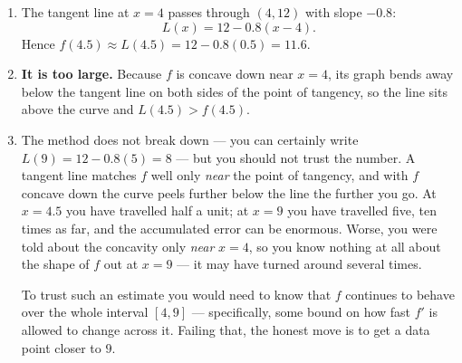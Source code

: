 \documentclass[11pt]{article}
\begin{document}
\begin{enumerate}
\item The tangent line at $x=4$ passes through $(4,12)$ with slope $-0.8$:
\[
L(x) = 12 - 0.8(x-4).
\]
Hence $f(4.5) \approx L(4.5) = 12 - 0.8(0.5) = \boxed{11.6}$.

\item \textbf{It is too large.} Because $f$ is concave down near $x=4$, its graph bends away
below the tangent line on both sides of the point of tangency, so the line sits above the
curve and $L(4.5) > f(4.5)$.

\smallskip
\begin{center}
\end{center}

\item The method does not break down --- you can certainly write $L(9) = 12-0.8(5) = 8$ ---
but you should not trust the number. A tangent line matches $f$ well only \emph{near} the
point of tangency, and with $f$ concave down the curve peels further below the line the
further you go. At $x=4.5$ you have travelled half a unit; at $x=9$ you have travelled five,
ten times as far, and the accumulated error can be enormous. Worse, you were told about the
concavity only \emph{near} $x=4$, so you know nothing at all about the shape of $f$ out at
$x=9$ --- it may have turned around several times.

To trust such an estimate you would need to know that $f$ continues to behave over the whole
interval $[4,9]$ --- specifically, some bound on how fast $f'$ is allowed to change across
it. Failing that, the honest move is to get a data point closer to $9$.
\end{enumerate}
\end{document}
